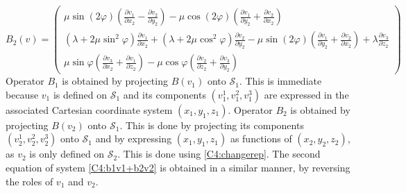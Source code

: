 \begin{equation}
B_2(v)=
\begin{pmatrix}
\mu \sin(2\varphi)\left( \frac{\partial v_1}{\partial x_2}-\frac{\partial v_2}{\partial y_2}\right)-\mu \cos(2\varphi)  \left( \frac{\partial v_1}{\partial y_2}+\frac{\partial v_2}{\partial x_2} \right)\\
(\lambda+2\mu \sin^2\varphi) \frac{\partial v_1}{\partial x_2}+(\lambda+2\mu \cos^2 \varphi)\frac{\partial v_2}{\partial y_2}-\mu \sin(2\varphi)  \left( \frac{\partial v_1}{\partial y_2}+\frac{\partial v_2}{\partial x_2} \right)+\lambda \frac{\partial v_3}{\partial z_2} \\
\mu\sin\varphi\left(\frac{\partial v_3}{\partial x_2}+\frac{\partial v_1}{\partial z_2} \right)-\mu\cos\varphi\left( \frac{\partial v_2}{\partial z_2} +\frac{\partial v_3}{\partial y_2} \right)
\end{pmatrix}
\label{C4:B2v2expl}
\end{equation}
Operator $B_1$ is obtained by projecting $B(v_1)$ onto $\mathcal{S}_1$. This is immediate because $v_1$ is defined on $\mathcal{S}_1$ and its components $(v_1^1,v_1^2,v_1^3)$ are expressed in the associated Cartesian coordinate system $(x_1,y_1,z_1)$. Operator $B_2$ is obtained by projecting $B(v_2)$ onto $\mathcal{S}_1$. This is done by projecting its components $(v_2^1,v_2^2,v_2^3)$ onto $\mathcal{S}_1$ and by expressing $(x_1,y_1,z_1)$ as functions of $(x_2,y_2,z_2)$, as $v_2$ is only defined on $\mathcal{S}_2$. This is done using \eqref{C4:changerep}. The second equation of system \eqref{C4:b1v1+b2v2} is obtained in a similar manner, by reversing the roles of $v_1$ and $v_2$.

